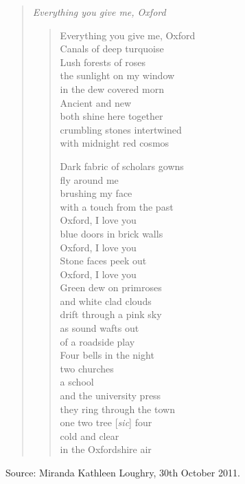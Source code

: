 \documentclass[a4paper]{article}
\begin{document}
\begin{quote}
	\emph{Everything you give me, Oxford}
	\begin{verse}
		\centering
		Everything you give me, Oxford \\
		Canals of deep turquoise \\
		Lush forests of roses \\
		the sunlight on my window \\
		in the dew covered morn \\

		\vspace{.1in}
		Ancient and new \\
		both shine here together \\
		crumbling stones intertwined \\
		with midnight red cosmos

		\vspace{.1in}
		Dark fabric of scholars gowns \\
		fly around me \\
		brushing my face \\
		with a touch from the past \\

		\vspace{.1in}
		Oxford, I love you \\
		blue doors in brick walls \\
		Oxford, I love you \\
		Stone faces peek out \\
		Oxford, I love you \\
		Green dew on primroses \\
		and white clad clouds \\
		drift through a pink sky \\
		as sound wafts out \\
		of a roadside play \\
		Four bells in the night \\
		two churches \\
		a school \\
		and the university press \\
		they ring through the town \\
		one two tree [\emph{sic}] four \\
		cold and clear \\
		in the Oxfordshire air \\
	\end{verse}
\end{quote}
Source: Miranda Kathleen Loughry, 30th October 2011.
\medskip
\end{document}
